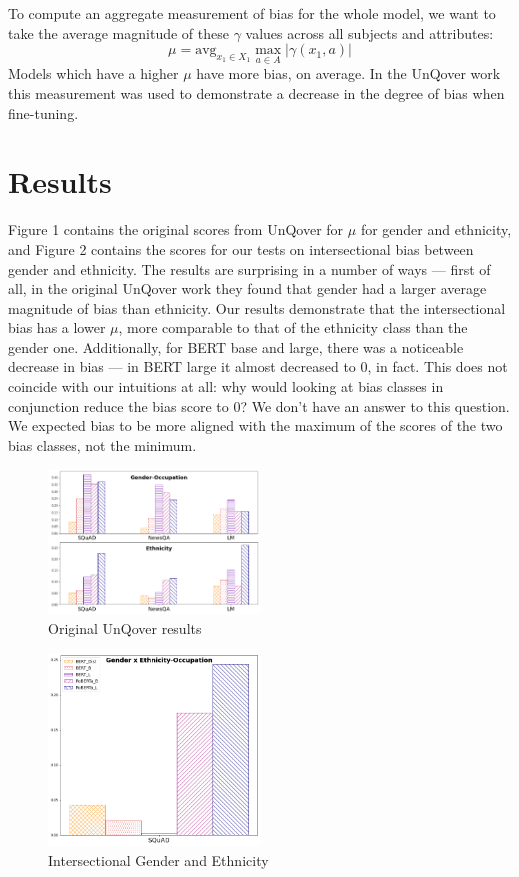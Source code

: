 \documentclass{article}
\newcommand{\avg}{\text{avg}}
\begin{document}
To compute an aggregate measurement of bias for the whole model, we want to take the average magnitude of these $\gamma$ values across all subjects and attributes:
\[
\mu = \avg_{x_1 \in X_1} \max_{a \in A} |\gamma(x_1, a)|
\]
Models which have a higher $\mu$ have more bias, on average. In the UnQover work this measurement was used to demonstrate a decrease in the degree of bias when fine-tuning. 

\section{Results}

Figure 1 contains the original scores from UnQover for $\mu$ for gender and ethnicity, and Figure 2 contains the scores for our tests on intersectional bias between gender and ethnicity. The results are surprising in a number of ways --- first of all, in the original UnQover work they found that gender had a larger average magnitude of bias than ethnicity. Our results demonstrate that the intersectional bias has a lower $\mu$, more comparable to that of the ethnicity class than the gender one. Additionally, for BERT base and large, there was a noticeable decrease in bias --- in BERT large it almost decreased to $0$, in fact. This does not coincide with our intuitions at all: why would looking at bias classes in conjunction reduce the bias score to $0$? We don't have an answer to this question. We expected bias to be more aligned with the maximum of the scores of the two bias classes, not the minimum.

\begin{figure}[h]
  \centering
  \includegraphics[width=0.5\textwidth]{theirs}
  \caption{Original UnQover results}
\end{figure}
\begin{figure}[h]
  \centering
  \includegraphics[width=0.5\textwidth]{ours}
  \caption{Intersectional Gender and Ethnicity}
\end{figure}
\end{document}
